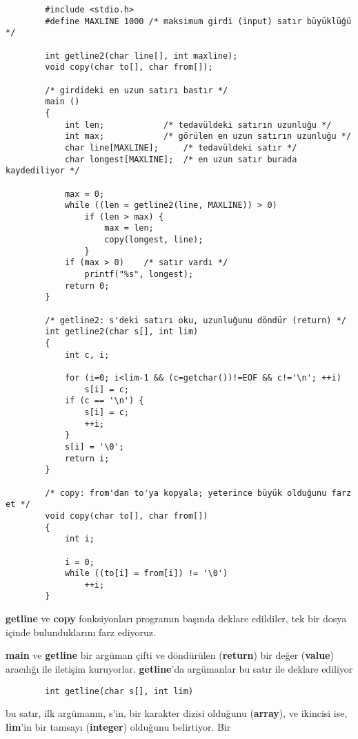\documentclass[a4paper,12pt,oneside]{book}
\begin{document}
\begin{samepage}
\begin{lstlisting}
		#include <stdio.h>
		#define MAXLINE 1000 /* maksimum girdi (input) satır büyüklüğü */

		int getline2(char line[], int maxline);
		void copy(char to[], char from[]);

		/* girdideki en uzun satırı bastır */
		main ()
		{
			int len;			/* tedavüldeki satırın uzunluğu */
			int max;			/* görülen en uzun satırın uzunluğu */
			char line[MAXLINE];		/* tedavüldeki satır */
			char longest[MAXLINE];	/* en uzun satır burada kaydediliyor */

			max = 0;
			while ((len = getline2(line, MAXLINE)) > 0)
				if (len > max) {
					max = len;
					copy(longest, line);
				}
			if (max > 0)	/* satır vardı */
				printf("%s", longest);
			return 0;
		}

		/* getline2: s'deki satırı oku, uzunluğunu döndür (return) */
		int getline2(char s[], int lim)
		{
			int c, i;

			for (i=0; i<lim-1 && (c=getchar())!=EOF && c!='\n'; ++i)
				s[i] = c;
			if (c == '\n') {
				s[i] = c;
				++i;
			}
			s[i] = '\0';
			return i;
		}

		/* copy: from'dan to'ya kopyala; yeterince büyük olduğunu farz et */
		void copy(char to[], char from[])
		{
			int i;

			i = 0;
			while ((to[i] = from[i]) != '\0')
				++i;
		}
\end{lstlisting}
\end{samepage} \pagebreak
\textbf{getline} ve \textbf{copy} fonksiyonları programın başında deklare edildiler, tek bir dosya içinde bulunduklarını farz ediyoruz.
\par \textbf{main} ve \textbf{getline} bir argüman çifti ve döndürülen (\textbf{return}) bir değer (\textbf{value}) aracılığı ile iletişim kuruyorlar. \textbf{getline}'da argümanlar bu satır ile deklare ediliyor
\begin{lstlisting}
		int getline(char s[], int lim)
\end{lstlisting}
bu satır, ilk argümanın, s'in, bir karakter dizisi olduğunu (\textbf{array}), ve ikincisi ise, \textbf{lim}'in bir tamsayı (\textbf{integer}) olduğunu belirtiyor. Bir
\end{document}
